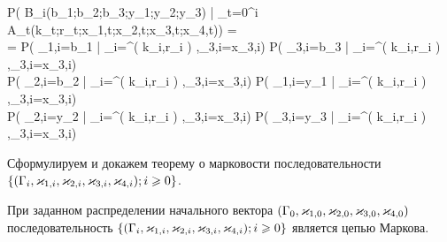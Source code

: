 \documentclass[a4paper,12pt,russian]{extarticle}
\newcommand{\G}{\Gamma}
\renewcommand{\P}[2]{P( #1 | #2)}
\newcommand{\Mark}{\{(\G_i, \vk_{1,i}, \vk_{2,i}, \vk_{3,i}, \vk_{4,i}); i \geqslant 0\}}
\newcommand{\ga}[1]{\Gamma^{\left( #1 \right)} }
\begin{document}
\ml
{
\label{etaXiIndependence}
\P{B_i(b_1;b_2;b_3;y_1;y_2;y_3)}{\bigcap_{t=0}^{i} A_t(k_t;r_t;x_{1,t};x_{2,t};x_{3,t};x_{4,t})} = \\
= \P{\eta_{1,i}=b_1}{\G_i=\ga{k_i,r_i},\vk_{3,i}=x_{3,i}} \times 
\P{\eta_{3,i}=b_3}{\G_i=\ga{k_i,r_i},\vk_{3,i}=x_{3,i}} \times \\
\P{\eta_{2,i}=b_2}{\G_i=\ga{k_i,r_i},\vk_{3,i}=x_{3,i}} \times \P{\xi_{1,i}=y_1}{\G_i=\ga{k_i,r_i},\vk_{3,i}=x_{3,i}} \times\\
\times  \P{\xi_{2,i}=y_2}{\G_i=\ga{k_i,r_i},\vk_{3,i}=x_{3,i}} \times 
\P{\xi_{3,i}=y_3}{\G_i=\ga{k_i,r_i},\vk_{3,i}=x_{3,i}}
}

Сформулируем и докажем теорему о марковости последовательности \linebreak$\Mark$.
\begin{theorem}
При заданном распределении начального вектора $(\G_0,\vk_{1,0},\vk_{2,0},\vk_{3,0},\vk_{4,0})$ последовательность $\Mark$ является цепью Маркова. 
\end{theorem}
\end{document}
